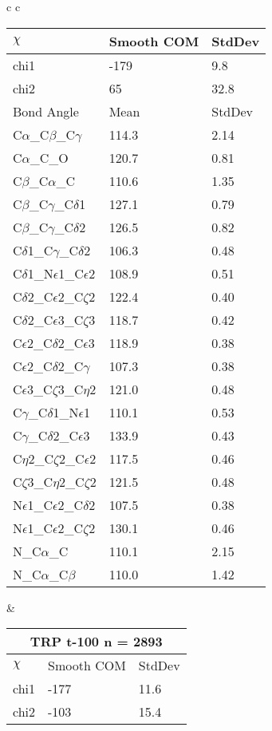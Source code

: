 \begin{longtable}{ c c }
\begin{tabular}{ l l l }
  $\chi$       & Smooth COM & StdDev \\ \midrule
  chi1 & -179 & 9.8 \\ 
  chi2 & 65 & 32.8 \\ \midrule
  Bond Angle   & Mean     & StdDev \\ \midrule
  C$\alpha$\_C$\beta$\_C$\gamma$ & 114.3 & 2.14\\
  C$\alpha$\_C\_O & 120.7 & 0.81\\
  C$\beta$\_C$\alpha$\_C & 110.6 & 1.35\\
  C$\beta$\_C$\gamma$\_C$\delta$1 & 127.1 & 0.79\\
  C$\beta$\_C$\gamma$\_C$\delta$2 & 126.5 & 0.82\\
  C$\delta$1\_C$\gamma$\_C$\delta$2 & 106.3 & 0.48\\
  C$\delta$1\_N$\epsilon$1\_C$\epsilon$2 & 108.9 & 0.51\\
  C$\delta$2\_C$\epsilon$2\_C$\zeta$2 & 122.4 & 0.40\\
  C$\delta$2\_C$\epsilon$3\_C$\zeta$3 & 118.7 & 0.42\\
  C$\epsilon$2\_C$\delta$2\_C$\epsilon$3 & 118.9 & 0.38\\
  C$\epsilon$2\_C$\delta$2\_C$\gamma$ & 107.3 & 0.38\\
  C$\epsilon$3\_C$\zeta$3\_C$\eta$2 & 121.0 & 0.48\\
  C$\gamma$\_C$\delta$1\_N$\epsilon$1 & 110.1 & 0.53\\
  C$\gamma$\_C$\delta$2\_C$\epsilon$3 & 133.9 & 0.43\\
  C$\eta$2\_C$\zeta$2\_C$\epsilon$2 & 117.5 & 0.46\\
  C$\zeta$3\_C$\eta$2\_C$\zeta$2 & 121.5 & 0.48\\
  N$\epsilon$1\_C$\epsilon$2\_C$\delta$2 & 107.5 & 0.38\\
  N$\epsilon$1\_C$\epsilon$2\_C$\zeta$2 & 130.1 & 0.46\\
  N\_C$\alpha$\_C & 110.1 & 2.15\\
  N\_C$\alpha$\_C$\beta$ & 110.0 & 1.42\\
  \bottomrule
  \end{tabular}
  &
  \begin{tabular}{ l l l }
  \toprule
  \multicolumn{3}{c}{TRP \textbf{t-100} n = 2893} \\ \toprule
  $\chi$       & Smooth COM & StdDev \\ \midrule
  chi1 & -177 & 11.6 \\ 
  chi2 & -103 & 15.4 \\ \midrule

\end{tabular}
\end{longtable}
